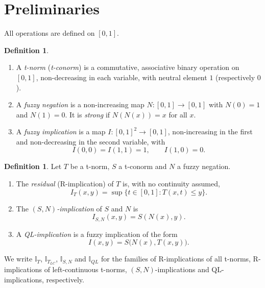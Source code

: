 \documentclass[11pt]{amsart}
\numberwithin{equation}{section}
\theoremstyle{definition}
\newtheorem{definition}[theorem]{Definition}
\theoremstyle{remark}
\newcommand{\cI}{\mathbb{I}}
\begin{document}
\section{Preliminaries}\label{sec:prelim}

All operations are defined on $[0,1]$.

\begin{definition}\label{def:basic}
\begin{enumerate}[label=\textup{(\alph*)},leftmargin=*,itemsep=2pt]
\item A \emph{t-norm} (\emph{t-conorm}) is a commutative, associative binary
operation on $[0,1]$, non-decreasing in each variable, with neutral element
$1$ (respectively $0$).
\item A \emph{fuzzy negation} is a non-increasing map $N\colon[0,1]\to[0,1]$
with $N(0)=1$ and $N(1)=0$. It is \emph{strong} if $N(N(x))=x$ for all $x$.
\item A \emph{fuzzy implication} is a map $I\colon[0,1]^2\to[0,1]$,
non-increasing in the first and non-decreasing in the second variable, with
\begin{equation}\label{eq:fi}
  I(0,0)=I(1,1)=1,\qquad I(1,0)=0.
\end{equation}
\end{enumerate}
\end{definition}

\begin{definition}\label{def:families}
Let $T$ be a t-norm, $S$ a t-conorm and $N$ a fuzzy negation.
\begin{enumerate}[label=\textup{(\alph*)},leftmargin=*,itemsep=2pt]
\item The \emph{residual} (R-implication) of $T$ is, with no continuity
assumed,
\begin{equation}\label{eq:residual}
  I_T(x,y)=\sup\{t\in[0,1] : T(x,t)\le y\}.
\end{equation}
\item The \emph{$(S,N)$-implication} of $S$ and $N$ is
\begin{equation}\label{eq:sn}
  I_{S,N}(x,y)=S(N(x),y).
\end{equation}
\item A \emph{QL-implication} is a fuzzy implication of the form
\begin{equation}\label{eq:ql}
  I(x,y)=S\bigl(N(x),T(x,y)\bigr).
\end{equation}
\end{enumerate}
We write $\cI_T$, $\cI_{T_{LC}}$, $\cI_{S,N}$ and $\cI_{QL}$ for the families
of R-implications of all t-norms, R-implications of left-continuous t-norms,
$(S,N)$-implications and QL-implications, respectively.
\end{definition}
\end{document}
